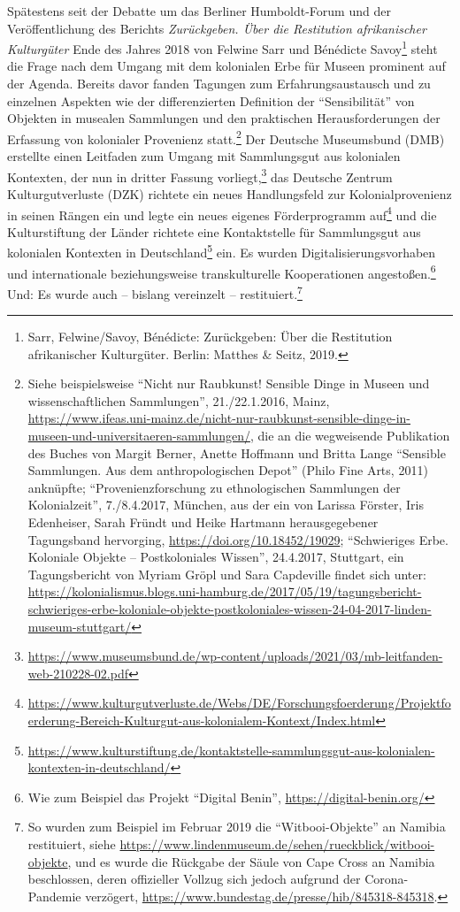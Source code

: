 \documentclass[a4paper,
fontsize=11pt,
oneside,
numbers=noperiodatend,
parskip=half-,
bibliography=totoc,
final
]{scrartcl}
\begin{document}
Spätestens seit der Debatte um das Berliner Humboldt-Forum und der
Veröffentlichung des Berichts \emph{Zurückgeben. Über die Restitution
afrikanischer Kulturgüter} Ende des Jahres 2018 von Felwine Sarr und
Bénédicte Savoy\footnote{Sarr, Felwine/Savoy, Bénédicte: Zurückgeben:
  Über die Restitution afrikanischer Kulturgüter. Berlin: Matthes \&
  Seitz, 2019.} steht die Frage nach dem Umgang mit dem kolonialen Erbe
für Museen prominent auf der Agenda. Bereits davor fanden Tagungen zum
Erfahrungsaustausch und zu einzelnen Aspekten wie der differenzierten
Definition der \enquote{Sensibilität} von Objekten in musealen
Sammlungen und den praktischen Herausforderungen der Erfassung von
kolonialer Provenienz statt.\footnote{Siehe beispielsweise
  \enquote{Nicht nur Raubkunst! Sensible Dinge in Museen und
  wissenschaftlichen Sammlungen}, 21./22.1.2016, Mainz,
  \url{https://www.ifeas.uni-mainz.de/nicht-nur-raubkunst-sensible-dinge-in-museen-und-universitaeren-sammlungen/},
  die an die wegweisende Publikation des Buches von Margit Berner,
  Anette Hoffmann und Britta Lange \enquote{Sensible Sammlungen. Aus dem
  anthropologischen Depot} (Philo Fine Arts, 2011) anknüpfte;
  \enquote{Provenienzforschung zu ethnologischen Sammlungen der
  Kolonialzeit}, 7./8.4.2017, München, aus der ein von Larissa Förster,
  Iris Edenheiser, Sarah Fründt und Heike Hartmann herausgegebener
  Tagungsband hervorging, \url{https://doi.org/10.18452/19029};
  \enquote{Schwieriges Erbe. Koloniale Objekte -- Postkoloniales
  Wissen}, 24.4.2017, Stuttgart, ein Tagungsbericht von Myriam Gröpl und
  Sara Capdeville findet sich unter:
  \url{https://kolonialismus.blogs.uni-hamburg.de/2017/05/19/tagungsbericht-schwieriges-erbe-koloniale-objekte-postkoloniales-wissen-24-04-2017-linden-museum-stuttgart/}}
Der Deutsche Museumsbund (DMB) erstellte einen Leitfaden zum Umgang mit
Sammlungsgut aus kolonialen Kontexten, der nun in dritter Fassung
vorliegt,\footnote{\url{https://www.museumsbund.de/wp-content/uploads/2021/03/mb-leitfanden-web-210228-02.pdf}}
das Deutsche Zentrum Kulturgutverluste (DZK) richtete ein neues
Handlungsfeld zur Kolonialprovenienz in seinen Rängen ein und legte ein
neues eigenes Förderprogramm auf\footnote{\url{https://www.kulturgutverluste.de/Webs/DE/Forschungsfoerderung/Projektfoerderung-Bereich-Kulturgut-aus-kolonialem-Kontext/Index.html}}
und die Kulturstiftung der Länder richtete eine Kontaktstelle für
Sammlungsgut aus kolonialen Kontexten in Deutschland\footnote{\url{https://www.kulturstiftung.de/kontaktstelle-sammlungsgut-aus-kolonialen-kontexten-in-deutschland/}}
ein. Es wurden Digitalisierungsvorhaben und internationale
beziehungsweise transkulturelle Kooperationen angestoßen.\footnote{Wie
  zum Beispiel das Projekt \enquote{Digital Benin},
  \url{https://digital-benin.org/}} Und: Es wurde auch -- bislang
vereinzelt -- restituiert.\footnote{So wurden zum Beispiel im Februar
  2019 die \enquote{Witbooi-Objekte} an Namibia restituiert, siehe
  \url{https://www.lindenmuseum.de/sehen/rueckblick/witbooi-objekte},
  und es wurde die Rückgabe der Säule von Cape Cross an Namibia
  beschlossen, deren offizieller Vollzug sich jedoch aufgrund der
  Corona-Pandemie verzögert,
  \url{https://www.bundestag.de/presse/hib/845318-845318}.}
\end{document}

